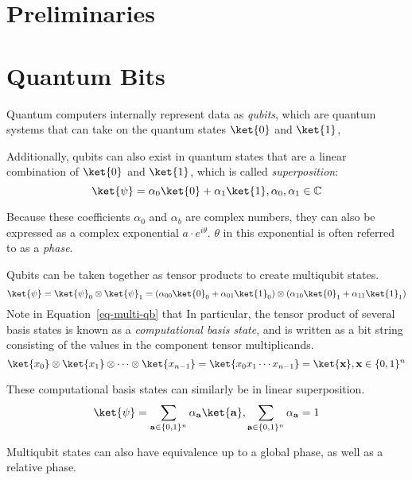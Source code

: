 \section{Preliminaries}

\section{Quantum Bits}
\label{Chap:Pre-qubits}
Quantum computers internally represent data as \emph{qubits}, which are quantum systems that can
take on the quantum states $\ket{0}$ and $\ket{1}$,

Additionally, qubits can also exist in quantum states that are a linear combination of $\ket{0}$ and
$\ket{1}$, which is called {\it superposition}:
\begin{equation}
\ket{\psi} = \alpha_0 \ket{0} + \alpha_1 \ket{1}, \alpha_0, \alpha_1 \in \mathbb{C}
\end{equation}

Because these coefficients $\alpha_0$ and $\alpha_b$ are complex numbers, they can also be expressed as
a complex exponential $a\cdot e^{i \theta}$.
$\theta$ in this exponential is often referred to as a {\it phase}.

Qubits can be taken together as tensor products to create multiqubit states.
\begin{equation}
\label{eq-multi-qb}
\ket{\psi} = \ket{\psi}_0 \otimes \ket{\psi}_1 =(\alpha_{00} \ket{0}_0 + \alpha_{01} \ket{1}_0) \otimes
(\alpha_{10} \ket{0}_1 + \alpha_{11} \ket{1}_1)
\end{equation}
Note in Equation~\ref{eq-multi-qb} that In particular, the tensor product of several basis states is known as a \emph{computational basis state},
and is written as a bit string consisting of the values in the component tensor multiplicands. 
\begin{equation}
\ket{x_0}\otimes\ket{x_1}\otimes\cdots\otimes\ket{x_{n-1}}=\ket{x_0 x_1 \cdots x_{n-1}}=\ket{\mathbf{x}},
\mathbf{x} \in \{0,1\}^n
\end{equation}

These computational basis states can similarly be in linear superposition.
\begin{equation}
\ket{\psi} = \sum_{\mathbf{a} \in \{0,1\}^n} \alpha_{\mathbf{a}}\ket{\mathbf{a}},
\sum_{\mathbf{a} \in \{0,1\}^n} \alpha_{\mathbf{a}} = 1
\end{equation}

Multiqubit states can also have equivalence up to a global phase, as well as a relative phase.

